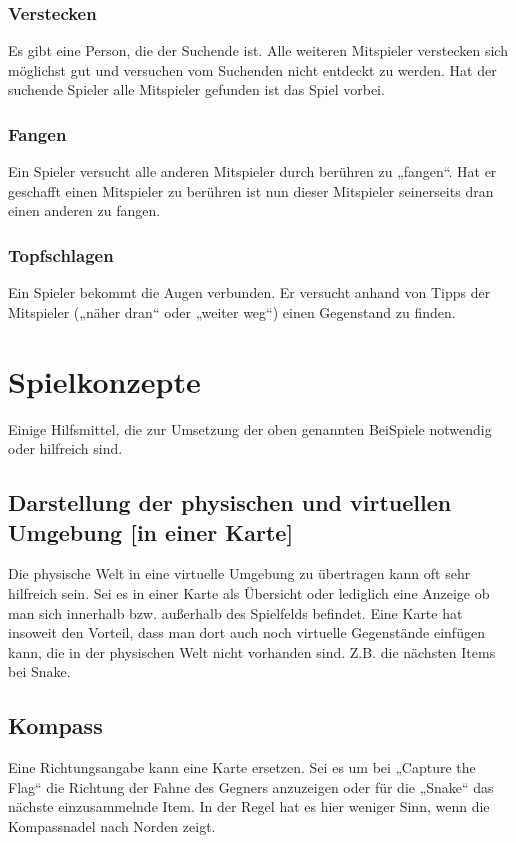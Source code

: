 \documentclass[runningheads,a4paper]{llncs}
\begin{document}
\subsubsection{Verstecken}
Es gibt eine Person, die der Suchende ist. Alle weiteren Mitspieler verstecken sich möglichst
gut und versuchen vom Suchenden nicht entdeckt zu werden. Hat der suchende Spieler
alle Mitspieler gefunden ist das Spiel vorbei.
\subsubsection{Fangen}
Ein Spieler versucht alle anderen Mitspieler durch berühren zu „fangen“. Hat er geschafft
einen Mitspieler zu berühren ist nun dieser Mitspieler seinerseits dran einen anderen zu
fangen.
\subsubsection{Topfschlagen}
Ein Spieler bekommt die Augen verbunden. Er versucht anhand von Tipps der Mitspieler
(„näher dran“ oder „weiter weg“) einen Gegenstand zu finden.

\section{Spielkonzepte}
Einige Hilfsmittel, die zur Umsetzung der oben genannten BeiSpiele notwendig oder
hilfreich sind.

\subsection{Darstellung der physischen und virtuellen Umgebung [in einer Karte]}

Die physische Welt in eine virtuelle Umgebung zu übertragen kann oft sehr hilfreich sein.
Sei es in einer Karte als Übersicht oder lediglich eine Anzeige ob man sich innerhalb bzw.
außerhalb des Spielfelds befindet. Eine Karte hat insoweit den Vorteil, dass man dort auch
noch virtuelle Gegenstände einfügen kann, die in der physischen Welt nicht vorhanden
sind. Z.B. die nächsten Items bei Snake.

\subsection{Kompass}

Eine Richtungsangabe kann eine Karte ersetzen. Sei es um bei „Capture the Flag“ die
Richtung der Fahne des Gegners anzuzeigen oder für die „Snake“ das nächste
einzusammelnde Item. In der Regel hat es hier weniger Sinn, wenn die Kompassnadel nach
Norden zeigt.
\end{document}
